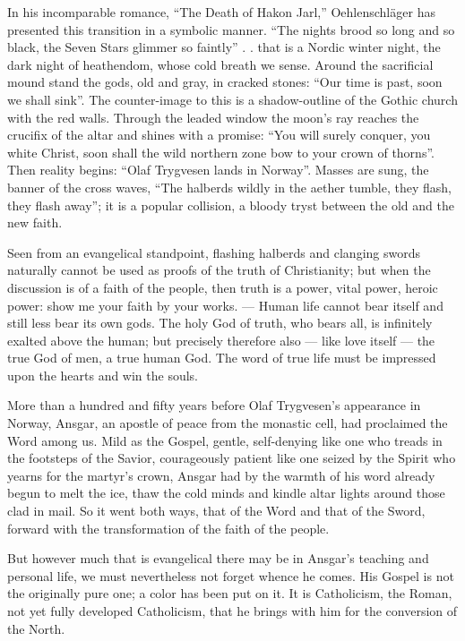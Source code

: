 \documentclass[12pt,a4paper,openany]{book}
\newcommand{\opage}[1]{\marginnote{\footnotesize\textit{[#1]}}}
\begin{document}
In his incomparable romance, ``The Death of Hakon Jarl,'' Oehlenschläger
has presented this transition in a symbolic
manner. ``The nights brood so long and so black,
the Seven Stars glimmer so faintly'' . . that is a Nordic
winter night, the dark night of heathendom, whose cold breath
we sense. Around the sacrificial mound stand the gods, old %
and gray, in cracked stones: ``Our time is past, soon
we shall sink''. The counter-image to this is a shadow-outline of the
Gothic church with the red walls. Through the leaded window
the moon's ray reaches the crucifix of the altar and
shines with a promise: ``You will surely conquer, you white
Christ, soon shall the wild northern zone bow to
your crown of thorns''. Then reality begins: ``Olaf Trygvesen lands in Norway''. Masses are sung, the banner of the cross
waves, ``The halberds wildly in the aether tumble,
they flash, they flash away''; it is a popular collision, a
bloody tryst between the old and the new faith.

Seen from an evangelical standpoint, flashing
halberds and clanging swords naturally cannot be used as
proofs of the truth of Christianity; but when the
discussion is of a faith of the people, then truth is a power,
\setcounter{footnote}{0}%
\opage{73}vital power, heroic power: show me your faith by your works.
--- Human life cannot bear itself and still less
bear its own gods. The holy God of truth,
who bears all, is infinitely exalted above the
human; but precisely therefore also --- like love
itself --- the true God of men, a true human God.
The word of true life must be impressed upon
the hearts and win the souls.

More than a hundred and fifty years before Olaf Trygvesen's
appearance in Norway, Ansgar, an apostle of peace
from the monastic cell, had proclaimed the Word among us. Mild as
the Gospel, gentle, self-denying like one who
treads in the footsteps of the Savior, courageously patient like one
seized by the Spirit who yearns for the martyr's crown,
Ansgar had by the warmth of his word already begun to melt
the ice, thaw the cold minds and kindle altar lights around
those clad in mail. So it went both ways, that of the Word
and that of the Sword, forward with the transformation of the faith of the people.

But however much that is evangelical there may be in Ansgar's
teaching and personal life, we must nevertheless not forget
whence he comes. His Gospel is not the
originally pure one; a color has been put on it. It is
Catholicism, the Roman, not yet fully developed
Catholicism, that he brings with him for the conversion of the North.
\end{document}
